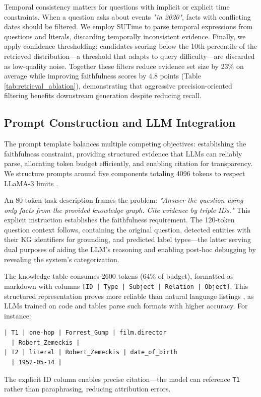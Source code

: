 \documentclass[conference]{IEEEtran}
\begin{document}
Temporal consistency matters for questions with implicit or explicit time constraints. When a question asks about events \emph{"in 2020"}, facts with conflicting dates should be filtered. We employ SUTime \cite{chang2012sutime} to parse temporal expressions from questions and literals, discarding temporally inconsistent evidence. Finally, we apply confidence thresholding: candidates scoring below the 10th percentile of the retrieved distribution—a threshold that adapts to query difficulty—are discarded as low-quality noise. Together these filters reduce evidence set size by 23\% on average while improving faithfulness scores by 4.8 points (Table \ref{tab:retrieval_ablation}), demonstrating that aggressive precision-oriented filtering benefits downstream generation despite reducing recall.

\subsection{Prompt Construction and LLM Integration}
\label{sec:prompt}

The prompt template balances multiple competing objectives: establishing the faithfulness constraint, providing structured evidence that LLMs can reliably parse, allocating token budget efficiently, and enabling citation for transparency. We structure prompts around five components totaling 4096 tokens to respect LLaMA-3 limits \cite{touvron2023llama}.

An 80-token task description frames the problem: \emph{"Answer the question using only facts from the provided knowledge graph. Cite evidence by triple IDs."} This explicit instruction establishes the faithfulness requirement. The 120-token question context follows, containing the original question, detected entities with their KG identifiers for grounding, and predicted label types—the latter serving dual purposes of aiding the LLM's reasoning and enabling post-hoc debugging by revealing the system's categorization.

The knowledge table consumes 2600 tokens (64\% of budget), formatted as markdown with columns \texttt{[ID | Type | Subject | Relation | Object]}. This structured representation proves more reliable than natural language listings \cite{press2023measuring}, as LLMs trained on code and tables parse such formats with higher accuracy. For instance:
\begin{verbatim}
| T1 | one-hop | Forrest_Gump | film.director
  | Robert_Zemeckis |
| T2 | literal | Robert_Zemeckis | date_of_birth
  | 1952-05-14 |
\end{verbatim}
The explicit ID column enables precise citation—the model can reference \texttt{T1} rather than paraphrasing, reducing attribution errors.
\end{document}
